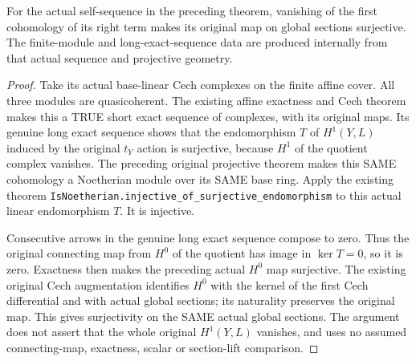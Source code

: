 \begin{lemma}
\label{lem:projective-central-fibre-hopfian-obstruction}
\leanok
For the actual self-sequence in the preceding theorem, vanishing of the
first cohomology of its right term makes its original map on global
sections surjective. The finite-module and long-exact-sequence data are
produced internally from that actual sequence and projective geometry.
\end{lemma}
\begin{proof}
Take its actual base-linear Cech complexes on the finite affine cover.
All three modules are quasicoherent. The existing affine exactness
and Cech theorem makes this a TRUE short exact sequence of complexes,
with its original maps. Its genuine long exact sequence shows that the
endomorphism $T$ of $H^1(Y,L)$ induced by the original $t_Y$ action is
surjective, because $H^1$ of the quotient complex vanishes.
The preceding original projective theorem makes this SAME cohomology a
Noetherian module over its SAME base ring. Apply the existing theorem
\texttt{IsNoetherian.injective\_of\_surjective\_endomorphism}
to this actual linear endomorphism $T$. It is injective.

Consecutive arrows in the genuine long exact sequence compose to zero.
Thus the original connecting map from $H^0$ of the quotient has image
in $\ker T=0$, so it is zero. Exactness then makes the preceding actual
$H^0$ map surjective. The existing original Cech augmentation identifies
$H^0$ with the kernel of the first Cech differential and with actual
global sections; its naturality preserves the original map. This gives
surjectivity on the SAME actual global sections. The argument does not
assert that the whole original $H^1(Y,L)$ vanishes, and uses no assumed
connecting-map, exactness, scalar or section-lift comparison.
\end{proof}


